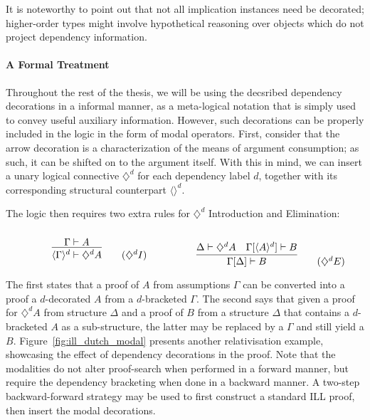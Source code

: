 It is noteworthy to point out that not all implication instances need be decorated; higher-order types might involve hypothetical reasoning over objects which do not project dependency information.

\paragraph{A Formal Treatment}
Throughout the rest of the thesis, we will be using the decsribed dependency decorations in a informal manner, as a meta-logical notation that is simply used to convey useful auxiliary information.
However, such decorations can be properly included in the logic in the form of modal operators.
First, consider that the arrow decoration is a characterization of the means of argument consumption; as such, it can be shifted on to the argument itself.
With this in mind, we can insert a unary logical connective $\diamondsuit^d$ for each dependency label $d$, together with its corresponding structural counterpart $\langle \rangle ^d$.

The logic then requires two extra rules for $\diamondsuit^d$ Introduction and Elimination:

\begin{align*}
    \begin{minipage}{0.5\textwidth}
	\[
        \infer{\langle \Gamma \rangle^d \vdash \diamondsuit^d A}{\Gamma \vdash A}\tag{$\diamondsuit^d I$}
    \]
    \end{minipage}
    \begin{minipage}{0.5\textwidth}
    \[
        \infer{\Gamma [\Delta] \vdash B}{
        \Delta \vdash \diamondsuit^d A
        &
        \Gamma[\langle A \rangle^d] \vdash B
        }\tag{$\diamondsuit^d E$}
    \]
    \end{minipage}
\end{align*}

The first states that a proof of $A$ from assumptions $\Gamma$ can be converted into a proof a $d$-decorated $A$ from a $d$-bracketed $\Gamma$.
The second says that given a proof for $\diamondsuit^d A$ from structure $\Delta$ and a proof of $B$ from a structure $\Delta$ that contains a $d$-bracketed $A$ as a sub-structure, the latter may be replaced by a $\Gamma$ and still yield a $B$.
Figure~\ref{fig:ill_dutch_modal} presents another relativisation example, showcasing the effect of dependency decorations in the proof.
Note that the modalities do not alter proof-search when performed in a forward manner, but require the dependency bracketing when done in a backward manner.
A two-step backward-forward strategy may be used to first construct a standard ILL proof, then insert the modal decorations.

